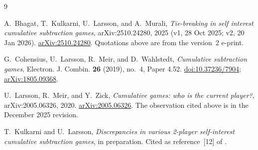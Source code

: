 \documentclass[11pt]{amsart}
\theoremstyle{definition}
\theoremstyle{remark}
\begin{document}
\begin{thebibliography}{9}

A.~Bhagat, T.~Kulkarni, U.~Larsson, and A.~Murali,
\emph{Tie-breaking in self interest cumulative subtraction games},
arXiv:2510.24280, 2025 (v1, 28 Oct 2025; v2, 20 Jan 2026).
\href{https://arxiv.org/abs/2510.24280}{arXiv:2510.24280}.
Quotations above are from the version~2 e-print.

G.~Cohensius, U.~Larsson, R.~Meir, and D.~Wahlstedt,
\emph{Cumulative subtraction games},
Electron. J. Combin. \textbf{26} (2019), no.~4, Paper 4.52.
\href{https://doi.org/10.37236/7904}{doi:10.37236/7904};
\href{https://arxiv.org/abs/1805.09368}{arXiv:1805.09368}.

U.~Larsson, R.~Meir, and Y.~Zick,
\emph{Cumulative games: who is the current player?},
arXiv:2005.06326, 2020.
\href{https://arxiv.org/abs/2005.06326}{arXiv:2005.06326}.
The observation cited above is in the December 2025 revision.

T.~Kulkarni and U.~Larsson,
\emph{Discrepancies in various 2-player self-interest cumulative subtraction
games}, in preparation. Cited as reference~[12] of \cite{BKLM}.

\end{thebibliography}
\end{document}
